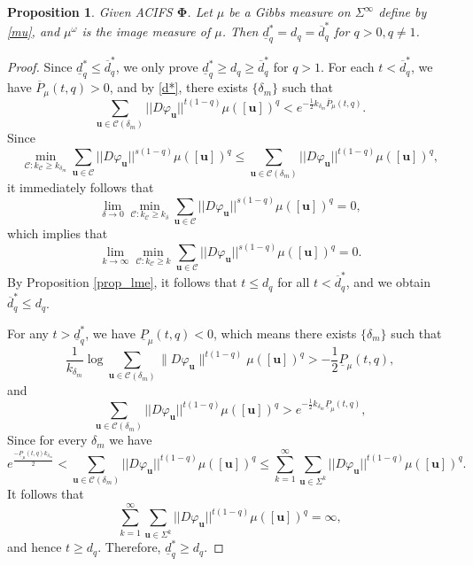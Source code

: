 \documentclass[12pt]{amsart}
\theoremstyle{plain}
\newtheorem{prop}[thm]{Proposition}
\theoremstyle{definition}
\theoremstyle{remark}
\newcommand{\bu}{\mathbf{u}}
\newcommand{\red}[1]{{\color{red}#1}}
\begin{document}

\begin{prop}\label{cut to qici A}
Given ACIFS $\boldsymbol{\Phi}$.  Let $\mu$ be a Gibbs measure on $\Sigma^\infty$ define by \eqref{mu}, and $\mu^\omega$ is the image measure of $\mu$. Then   $\underline{d}_q^*= d_q=\overline{d}_q^*$ for $q>0, q\neq1$.
\end{prop}
\begin{proof}
Since $\underline{d}_q^*\leq \overline{d}_q^*$, we only prove   $\underline{d}_q^*\ge d_q\ge \overline{d}_q^*$ for $q>1$. For each $t<\overline{d}_q^*$, we have $\overline P_\mu(t, q)>0$, and by \eqref{d*}, there exists $\{\delta_m\}$ such that
$$
\sum_{\mathbf{u}\in\mathcal{C}(\delta_m)}||D\varphi_\mathbf{u}||^{t(1-q)}\mu([\bu])^q<e^{-\frac{1}{2}k_{\delta_m} \overline P_\mu(t, q)}.
$$
Since 
$$
\min_{\mathcal{C}:k_\mathcal{C}\ge k_{\delta_m}}\sum_{\mathbf{u}\in\mathcal{C}}||D\varphi_\mathbf{u}||^{s(1-q)}\mu([\mathbf{u}])^q\le\sum_{\mathbf{u}\in\mathcal{C}(\delta_m)}||D\varphi_\mathbf{u}||^{t(1-q)}\mu([\bu])^q , 
$$
it immediately follows that 
$$
\lim_{\delta\to0}\min_{\mathcal{C}:k_\mathcal{C}\ge k_{\delta} }\sum_{\mathbf{u}\in\mathcal{C}}||D\varphi_\mathbf{u}||^{s(1-q)}\mu([\mathbf{u}])^q=0, 
$$
which implies that 
$$
\lim_{k\to\infty}\min_{\mathcal{C}:k_\mathcal{C}\ge k}\sum_{\mathbf{u}\in\mathcal{C}}||D\varphi_\mathbf{u}||^{s(1-q)}\mu([\mathbf{u}])^q=0. 
$$
By Proposition \ref{prop_lme}, it follows that $t\le d_q$ for all $t<\overline{d}_q^*$, and we obtain $\overline{d}_q^*\le d_q$.

For any $t>\underline{d}_q^*$, we have $\underline P_\mu(t, q)<0$,  which means there exists $\{\delta_m\}$ such that
$$
\frac{1}{k_{\delta_m}}\log \sum_{\mathbf{u}\in\mathcal{C}(\delta_m)}\|D\varphi_\mathbf{u}\|^{t(1-q)}\mu([\bu])^q > -\frac{1}{2}\underline P_\mu(t, q),
$$
and
$$
\sum_{\mathbf{u}\in\mathcal{C}(\delta_m)}||D\varphi_\mathbf{u}||^{t(1-q)}\mu([\bu])^q>e^{-\frac{1}{2}k_{\delta_m}  \underline P_\mu(t, q)},
$$
Since for every $\delta_m$ we have
$$
e^\frac{-\underline P_\mu(t, q)k_{\delta_m}}{2}<\sum_{\mathbf{u}\in\mathcal{C}(\delta_m)}||D\varphi_\mathbf{u}||^{t(1-q)}\mu([\bu])^q\le\sum_{k=1}^\infty\sum_{\mathbf{u}\in\Sigma^k}||D\varphi_\mathbf{u}||^{t(1-q)}\mu([\bu])^q.
$$
It follows that
$$
\sum_{k=1}^\infty\sum_{\mathbf{u}\in\Sigma^k}||D\varphi_\mathbf{u}||^{t(1-q)}\mu([\bu])^q=\infty,
$$
and hence $t\ge d_q$. Therefore,  $\underline{d}_q^*\ge d_q$. 
\end{proof}
\end{document}
